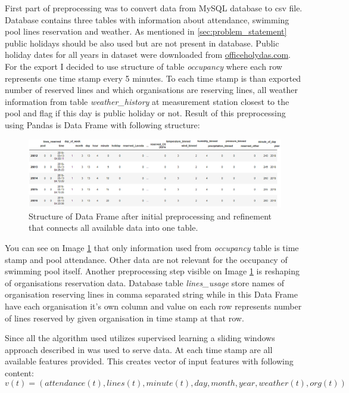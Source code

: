 \documentclass{article}
\begin{document}
First part of preprocessing was to convert data from MySQL database to csv file. Database contains three tables with information about attendance, swimming pool lines reservation and weather. As mentioned in \ref{sec:problem_statement} public holidays should be also used but are not present in database. Public holiday dates for all years in dataset were downloaded from \href{https://www.officeholidays.com/countries/czech-republic}{officeholydas.com}. For the export I decided to use structure of table \emph{occupancy} where each row represents one time stamp every 5 minutes. To each time stamp is than exported number of reserved lines and which organisations are reserving lines, all weather information from table \emph{weather\_history} at measurement station closest to the pool and flag if this day is public holiday or not. Result of this preprocessing using Pandas is Data Frame with following structure:

\begin{figure}[h!]
\centering
\includegraphics[width=12cm]{imgs/dataframe_head}
\caption{Structure of Data Frame after initial preprocessing and refinement that connects all available data into one table.}
\label{fig:dataframe_structure}
\end{figure}

You can see on Image \ref{fig:dataframe_structure} that only information used from \emph{occupancy} table is time stamp and pool attendance. Other data are not relevant for the occupancy of swimming pool itself. Another preprocessing step visible on Image \ref{fig:dataframe_structure} is reshaping of organisations reservation data. Database table \emph{lines\_usage} store names of organisation reserving lines in comma separated string while in this Data Frame have each organisation it's own column and value on each row represents number of lines reserved by given organisation in time stamp at that row. 

Since all the algorithm used utilizes supervised learning a sliding windows approach described in \citep{brownlee2019howtosupervised} was used to serve data. At each time stamp are all  available features provided. This creates vector of input features with following content:
\begin{equation}
\label{eq:input_vector}
v(t) = (attendance(t), lines(t), minute(t), day, month, year, weather(t), org(t))
\end{equation}
\end{document}
